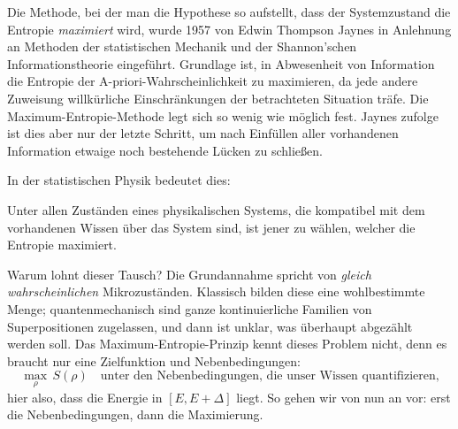 Die Methode, bei der man die Hypothese so aufstellt, dass der Systemzustand die Entropie \emph{maximiert} wird, wurde 1957 von Edwin Thompson Jaynes in Anlehnung an Methoden der statistischen Mechanik und der Shannon'schen Informationstheorie eingeführt. Grundlage ist, in Abwesenheit von Information die Entropie der A-priori-Wahrscheinlichkeit zu maximieren, da jede andere Zuweisung willkürliche Einschränkungen der betrachteten Situation träfe. Die Maximum-Entropie-Methode legt sich so wenig wie möglich fest. Jaynes zufolge ist dies aber nur der letzte Schritt, um nach Einfüllen aller vorhandenen Information etwaige noch bestehende Lücken zu schließen.

In der statistischen Physik bedeutet dies: 
\begin{center}
\parbox[c][5cm][c]{14cm}{\begin{tcolorbox}[colback=banana,arc=0cm,frame hidden,enhanced]{Unter allen Zuständen eines physikalischen Systems, die kompatibel mit dem vorhandenen Wissen über das System sind, ist jener zu wählen, welcher die Entropie maximiert.}\end{tcolorbox}}
\end{center}

Warum lohnt dieser Tausch? Die Grundannahme spricht von \emph{gleich wahrscheinlichen} Mikrozuständen. Klassisch bilden diese eine wohlbestimmte Menge; quantenmechanisch sind ganze kontinuierliche Familien von Superpositionen zugelassen, und dann ist unklar, was überhaupt abgezählt werden soll. Das Maximum-Entropie-Prinzip kennt dieses Problem nicht, denn es braucht nur eine Zielfunktion und Nebenbedingungen:
\begin{equation}
  \max_{\rho}\, S(\rho) \quad \text{unter den Nebenbedingungen, die unser Wissen quantifizieren,}
\end{equation}
hier also, dass die Energie in $[E,E+\Delta]$ liegt. So gehen wir von nun an vor: erst die Nebenbedingungen, dann die Maximierung.
